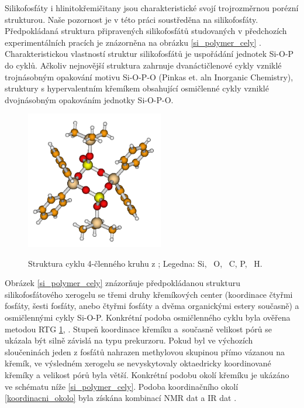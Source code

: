 \documentclass[
  digital, %
  table,   %
  lof,     %
  lot,     %
  oneside,
]{fithesis3}
\begin{document}
Silikofosfáty i hlinitokřemičitany jsou charakteristické svojí trojrozměrnou  porézní strukturou. Naše pozornost je v této práci soustředěna na silikofosfáty. Předpokládaná struktura připravených silikofosfátů studovaných v předchozích experimentálních pracích je znázorněna na obrázku \ref{si_polymer_cely} \cite{Styskalik2015thesis}. Charakteristickou vlastností struktur silikofosfátů je uspořádání jednotek Si-O-P do cyklů. Ačkoliv nejnovější struktura zahrnuje dvanáctičlenové cykly vzniklé trojnásobným opakování motivu Si-O-P-O (Pinkas et. aln Inorganic Chemistry), struktury s hypervalentním křemíkem obsahující osmičlenné cykly vzniklé dvojnásobným opakováním jednotky Si-O-P-O.
\begin{figure}
\caption{Struktura cyklu 4-členného kruhu z \cite{C4TA06823H};  Legedna:  Si, ~O, ~C,  P, ~H.}
 \center \includegraphics[width=6cm]{rtg_kruh_samostatne.png} \label{rtg_cyklus} \end{figure}
Obrázek \ref{si_polymer_cely} znázorňuje předpokládanou strukturu silikofosfátového xerogelu se třemi druhy křemíkových center (koordinace čtyřmi fosfáty, šesti fosfáty, anebo čtyřmi fosfáty a dvěma organickými estery současně) a osmičlennými cykly Si-O-P.  Konkrétní podoba osmičlenného cyklu byla ověřena metodou RTG \ref{rtg_cyklus}, \cite{C4TA06823H}. Stupeň koordinace křemíku a~současně velikost pórů se ukázala být silně závislá na typu prekurzoru. Pokud byl ve výchozích sloučeninách jeden z fosfátů nahrazen methylovou skupinou přímo vázanou na křemík, ve výsledném xerogelu se nevyskytovaly oktaedricky koordinované křemíky a velikost pórů byla větší. Konkrétní podobu okolí křemíku je ukázáno ve schématu níže \ref{si_polymer_cely}. Podoba koordinačního okolí \ref{koordinacni_okolo} byla získána kombinací NMR dat a IR dat \cite{C4TA06823H} \cite{Styskalik2015thesis}.
\end{document}
